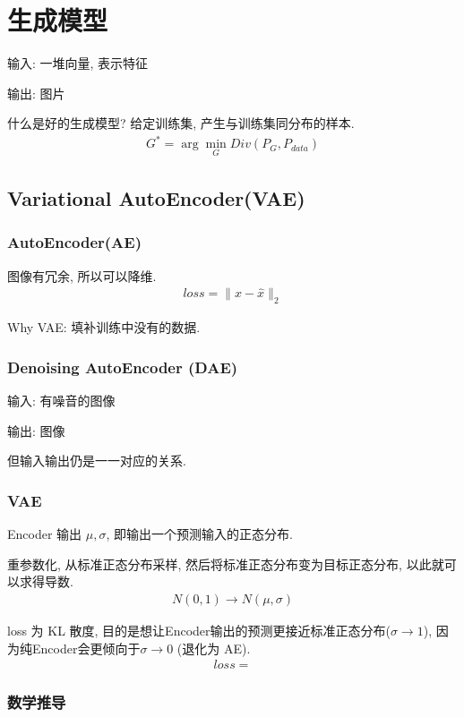 \newpage
\section{生成模型}
输入: 一堆向量, 表示特征

输出: 图片

什么是好的生成模型? 给定训练集, 产生与训练集同分布的样本. 
\begin{align*}
    G^*=\arg \min_G Div(P_G, P_{data})
\end{align*}


\subsection{Variational AutoEncoder(VAE)}
\subsubsection{AutoEncoder(AE)}
图像有冗余, 所以可以降维. 
\begin{align*}
    loss=\| x-\hat{x} \|_2
\end{align*}

Why VAE: 填补训练中没有的数据. 

\subsubsection{Denoising AutoEncoder (DAE)}
输入: 有噪音的图像

输出: 图像

但输入输出仍是一一对应的关系. 

\subsubsection{VAE}

Encoder 输出 $\mu, \sigma$, 即输出一个预测输入的正态分布. 

重参数化, 从标准正态分布采样, 然后将标准正态分布变为目标正态分布, 以此就可以求得导数. 
\begin{align*}
    N(0,1)\rightarrow N(\mu, \sigma)
\end{align*}

loss 为 KL 散度, 目的是想让Encoder输出的预测更接近标准正态分布($\sigma \rightarrow 1$), 因为纯Encoder会更倾向于$\sigma \rightarrow 0$ (退化为 AE). 
\begin{align*}
    loss=
\end{align*}

\subsubsection{数学推导}


